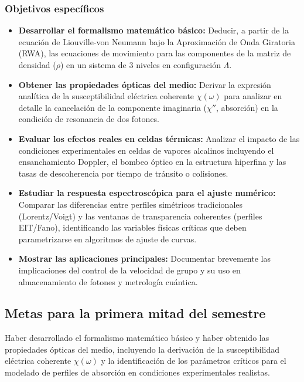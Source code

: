 \subsubsection{Objetivos específicos}
\begin{itemize}
    \item \textbf{Desarrollar el formalismo matemático básico:} Deducir, a partir de la ecuación de Liouville-von Neumann bajo la Aproximación de Onda Giratoria (RWA), las ecuaciones de movimiento para las componentes de la matriz de densidad ($\rho$) en un sistema de 3 niveles en configuración $\Lambda$.
    \item \textbf{Obtener las propiedades ópticas del medio:} Derivar la expresión analítica de la susceptibilidad eléctrica coherente $\chi(\omega)$ para analizar en detalle la cancelación de la componente imaginaria ($\chi''$, absorción) en la condición de resonancia de dos fotones.
    \item \textbf{Evaluar los efectos reales en celdas térmicas:} Analizar el impacto de las condiciones experimentales en celdas de vapores alcalinos incluyendo el ensanchamiento Doppler, el bombeo óptico en la estructura hiperfina y las tasas de descoherencia por tiempo de tránsito o colisiones.
    \item \textbf{Estudiar la respuesta espectroscópica para el ajuste numérico:} Comparar las diferencias entre perfiles simétricos tradicionales (Lorentz/Voigt) y las ventanas de transparencia coherentes (perfiles EIT/Fano), identificando las variables físicas críticas que deben parametrizarse en algoritmos de ajuste de curvas.
    \item \textbf{Mostrar las aplicaciones principales:} Documentar brevemente las implicaciones del control de la velocidad de grupo y su uso en almacenamiento de fotones y metrología cuántica.
\end{itemize}
\subsection{Metas para la primera mitad del semestre}
Haber desarrollado el formalismo matemático básico y haber obtenido las propiedades ópticas del medio, incluyendo la derivación de la susceptibilidad eléctrica coherente $\chi(\omega)$ y la identificación de los parámetros críticos para el modelado de perfiles de absorción en condiciones experimentales realistas.
\nocite{*}